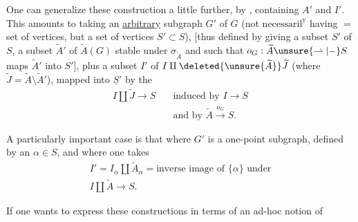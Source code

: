 One can generalize these construction a little further, by    , containing $A'$ and $I'$. This amounts to taking an \uline{arbitrary} subgraph $G'$ of $G$ (not $\text{necessaril}^{\text{y}}$ having  $=$ set of vertices, but a set of vertices $S'\subset S$), [thus defined by giving a subset $S'$ of $S$, a subset $\widetilde A'$ of $\widetilde A(G)$ stable under $\sigma_{\widetilde A}$ and such that $o_G:\widetilde A\unsure{\rightharpoonup|{-}}S$ maps $\widetilde A'$ into $S'$], plus a subset $I'$ of $I\amalg\deleted{\unsure{\widetilde A}}\widetilde J$ (where $\widetilde J=\widetilde A\setminus\widetilde A'$), mapped into $\underline{S}'$ by the 
\[
\begin{aligned}
I\amalg\widetilde J\longrightarrow S\quad &\text{induced by }I\longrightarrow S\\
&\text{and by }\widetilde A\xrightarrow{o_G}S.
\end{aligned}
\]

A particularly important case is that where $G'$ is a one-point subgraph, defined by an $\alpha\in S$,  and where one takes
\[
\begin{gathered}
I'=I_\alpha\amalg\widetilde A_\alpha=\text{inverse image of }\{\alpha\}\text{ under}\\
I\amalg\widetilde A\longrightarrow S.
\end{gathered}
\]

If one wants to express these constructions in terms of an ad-hoc notion of
